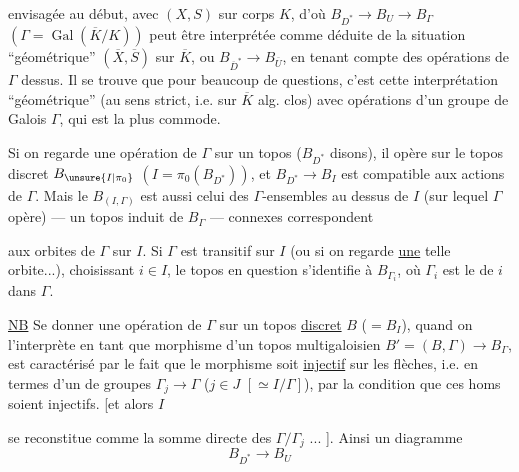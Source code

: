 
 envisagée au début, avec $(X,S)$ sur corps $K$,
d'où  $B_{D^*}\longrightarrow B_U\longrightarrow B_\Gamma$
$(\Gamma=\operatorname{Gal}(\overline K/K))$
peut être interprétée comme déduite
de la situation ``géométrique'' $(\overline X,\overline S)$ sur $\overline K$,
ou $B_{\overline D^*}\longrightarrow B_{\overline U}$, en tenant compte
des opérations de $\Gamma$ dessus. Il se trouve
que pour beaucoup de questions, c'est
cette interprétation ``géométrique'' (au
sens strict, i.e. sur $\overline K$ alg. clos) avec
opérations d'un groupe de Galois $\Gamma$, qui
est la plus commode.

Si on regarde une opération de $\Gamma$
sur un topos ($B_{D^*}$ disons),
il opère sur le topos discret $B_{\unsure{I|\pi_0}}$
$(I=\pi_0(B_{D^*}))$, et $B_{D^*}\longrightarrow B_I$ est
compatible aux actions de $\Gamma$. 
Mais le   $B_{(I,\Gamma)}$ est aussi
celui des $\Gamma$-ensembles au dessus de
$I$ (sur lequel $\Gamma$ opère) --- un topos induit
de $B_\Gamma$ ---  
connexes correspondent


aux orbites de $\Gamma$ sur $I$. Si $\Gamma$ est
transitif sur $I$  (ou si on regarde \uline{une}
telle orbite...), choisissant $i\in I$, le topos
en question s'identifie à $B_{\Gamma_i}$, où $\Gamma_i$
est le  de  $i$ dans $\Gamma$.

\uline{NB} Se donner une opération de $\Gamma$
sur un topos \uline{discret} $B$ ($=B_I$),
quand on l'interprète en tant
que morphisme d'un topos
multigaloisien $B'=(B,\Gamma)\longrightarrow B_\Gamma$,
est caractérisé par le fait que
le morphisme 
soit \uline{injectif} sur les
flèches, i.e. en termes d'un 
 de groupes $\Gamma_j\longrightarrow\Gamma$ ($j\in J$
$[\simeq I/\Gamma]$), par la condition que ces
homs soient injectifs. [et alors $I$

se reconstitue comme la somme
directe des $\Gamma/\Gamma_j$ ... ]. Ainsi un
diagramme
\[
 B_{D^*}\longrightarrow B_U
\]


